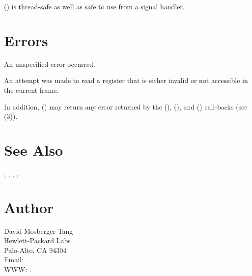 \documentclass{article}
\begin{document}
() is thread-safe as well as safe to use
from a signal handler.

\section{Errors}

\begin{Description}
\item[\Const{UNW\_EUNSPEC}] An unspecified error occurred.
\item[\Const{UNW\_EBADREG}] An attempt was made to read a register
  that is either invalid or not accessible in the current frame.
\end{Description}
In addition, () may return any error returned by
the (), (), and
() call-backs (see
(3)).

\section{See Also}

,
,
,
,

\section{Author}

\noindent
David Mosberger-Tang\\
Hewlett-Packard Labs\\
Palo-Alto, CA 94304\\
Email: \\
WWW: .
\LatexManEnd
\end{document}
